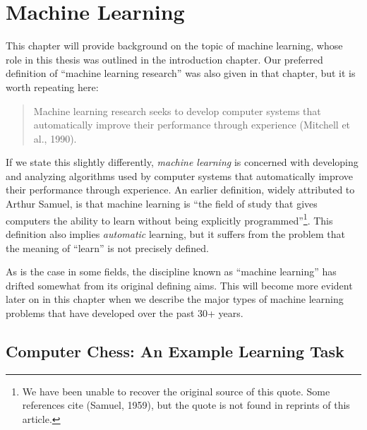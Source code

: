 \chapter{Machine Learning}
\label{ch:machine_learning}
%
This chapter will provide background on the topic of machine learning, whose role in this thesis was outlined in the introduction chapter. Our preferred definition of ``machine learning research'' was also given in that chapter, but it is worth repeating here:
%
\begin{quote}
Machine learning research seeks to develop computer systems that automatically improve their performance through experience (Mitchell et al., 1990).
\end{quote}
%	
If we state this slightly differently, \emph{machine learning} is concerned with developing and analyzing algorithms used by computer systems that automatically improve their performance through experience. An earlier definition, widely attributed to Arthur Samuel, is that machine learning is ``the field of study that gives computers the ability to learn without being
explicitly programmed''\footnote{We have been unable to recover the original source of this quote. Some references cite (Samuel, 1959), but the quote is not found in reprints of this article.}. This definition also implies \emph{automatic} learning, but it suffers from the problem that the meaning of ``learn'' is not precisely defined.

As is the case in some fields, the discipline known as ``machine learning'' has drifted somewhat from its original defining aims. This will become more evident later on in this chapter when we describe the major types of machine learning problems that have developed over the past 30+ years.

\section{Computer Chess: An Example Learning Task}
\label{sec:chess}

